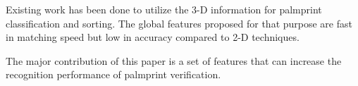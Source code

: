 Existing work has been done to utilize the 3-D information for palmprint classification and sorting. The global features proposed for that purpose are fast in matching speed but low in accuracy compared to 2-D techniques.

The major contribution of this paper is a set of features that can increase the recognition performance of palmprint verification.
